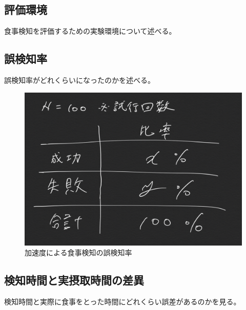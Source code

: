 \subsection{評価環境}
食事検知を評価するための実験環境について述べる。

\subsection{誤検知率}
誤検知率がどれくらいになったのかを述べる。

\begin{figure}[htbp]
  \caption{加速度による食事検知の誤検知率}
  \label{fig:success_failure_rate}
  \begin{center}
    \includegraphics[bb=0 0 1000 450,width=20cm]{assets/success_failure_rate.png}
  \end{center}
\end{figure}

\subsection{検知時間と実摂取時間の差異}
検知時間と実際に食事をとった時間にどれくらい誤差があるのかを見る。

